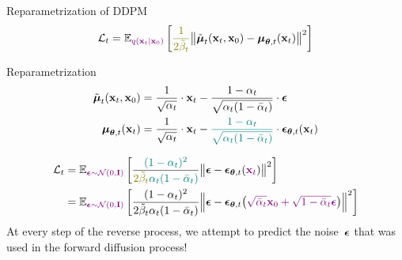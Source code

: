 \documentclass{beamer}
\begin{document}
\begin{frame}{Reparametrization of DDPM}
    \vspace{-0.3cm}
    \[
        \cL_t = \bbE_{\color{violet}q(\bx_t | \bx_0)} \left[ {\color{olive}\frac{1}{2\tilde{\beta}_t}} \bigl\| \tilde{\bmu}_t(\bx_t, \bx_0) - \bmu_{\btheta, t}(\bx_t) \bigr\|^2  \right]
    \]
    \vspace{-0.3cm}
    \begin{block}{Reparametrization}
        \vspace{-0.7cm}
        \begin{align*}
            \tilde{\boldsymbol{\mu}}_t(\mathbf{x}_t, \mathbf{x}_0) &= \frac{1}{\sqrt{\alpha_t}} \cdot \mathbf{x}_t - \frac{1 - \alpha_t}{\sqrt{\alpha_t (1 - \bar{\alpha}_t)}} \cdot \boldsymbol{\epsilon} \\
            \boldsymbol{\mu}_{\boldsymbol{\theta}, t}(\mathbf{x}_t) &= \frac{1}{\sqrt{\alpha_t}} \cdot \mathbf{x}_t - {\color{teal}\frac{1 - \alpha_t}{\sqrt{\alpha_t (1 - \bar{\alpha}_t)}}} \cdot \boldsymbol{\epsilon}_{\boldsymbol{\theta}, t}(\mathbf{x}_t)
        \end{align*}
        \vspace{-0.7cm}
    \end{block}
    \vspace{-0.5cm}
    \begin{align*}
        \cL_t &=  \bbE_{\color{violet} \bepsilon \sim \cN(0, \bI)} \left[ \frac{{\color{teal}(1 - \alpha_t)^2}}{{\color{olive}2\tilde{\beta}_t} {\color{teal} \alpha_t (1 - \bar{\alpha}_t)}} \bigl\| \bepsilon - \bepsilon_{\btheta, t}({\color{violet}\bx_t}) \bigr\|^2 \right] \\
        & =  \bbE_{\color{violet}\bepsilon \sim \cN(0, \bI)} \left[ \frac{(1 - \alpha_t)^2}{2\tilde{\beta}_t \alpha_t (1 - \bar{\alpha}_t)} \Bigl\| \bepsilon - \bepsilon_{\btheta, t}\bigl( {\color{violet}\sqrt{\bar{\alpha}_t} \bx_0 + \sqrt{1 - \bar{\alpha}_t} \bepsilon}\bigr) \Bigr\|^2 \right]
    \end{align*}
    At every step of the reverse process, we attempt to predict the noise~$\boldsymbol{\epsilon}$ that was used in the forward diffusion process!
\end{frame}
\end{document}
